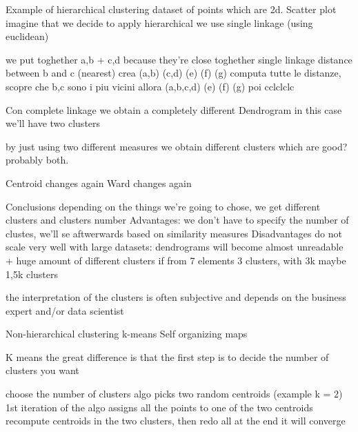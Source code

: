                 Example of hierarchical clustering 
                    dataset of points which are 2d. Scatter plot 
                    imagine that we decide to apply hierarchical we use single linkage (using euclidean)

                    we put toghether a,b + c,d because they're close toghether 
                        single linkage distance between b and c (nearest)
                        crea (a,b) (c,d) (e) (f) (g)
                        computa tutte le distanze, scopre che b,c sono i piu vicini
                        allora (a,b,c,d) (e) (f) (g)
                        poi cclclclc
                    
                    Con complete linkage we obtain a completely different Dendrogram
                    in this case we'll have two clusters

                    by just using two different measures we obtain different clusters 
                    which are good? probably both.

                    Centroid changes again 
                    Ward changes again 
                
                Conclusions 
                    depending on the things we're going to chose, we get different clusters and clusters number 
                    Advantages:
                        we don't have to specify the number of clustes, we'll se aftwerwards based on similarity measures
                    Disadvantages
                        do not scale very well with large datasets: dendrograms will become almost unreadable + huge amount of different clusters 
                        if from 7 elements 3 clusters, with 3k maybe 1,5k clusters 

                        the interpretation of the clusters is often subjective and depends on the business expert and/or data scientist
           
            Non-hierarchical clustering
                k-means
                Self organizing maps 

                K means 
                    the great difference is that the first step is to decide the number of clusters you want

                    choose the number of clusters 
                    algo picks two random centroids (example k = 2)
                    1st iteration of the algo assigns all the points to one of the two centroids
                    recompute centroids in the two clusters, then redo all 
                    at the end it will converge
                    

